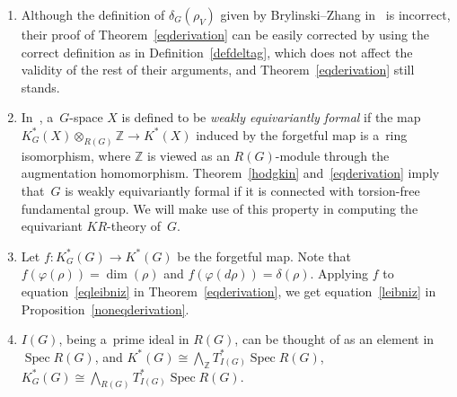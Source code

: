 \documentclass[pdftex]{sigma}
\numberwithin{equation}{section}
\DeclareMathOperator{\Spec}{Spec}
\begin{document}
\begin{Remark}\label{weakequivformality}\quad
\begin{enumerate}\itemsep=0pt
\item
Although the def\/inition of $\delta_G(\rho_V)$ given by Brylinski--Zhang in~\cite{BZ} is incorrect, their proof of
Theorem~\ref{eqderivation} can be easily corrected by using the correct def\/inition as in Def\/inition~\ref{defdeltag},
which does not af\/fect the validity of the rest of their arguments, and Theorem~\ref{eqderivation} still stands.
\item
In~\cite{HL}, a~$G$-space $X$ is def\/ined to be \emph{weakly equivariantly formal} if the map
$K^*_G(X)\otimes_{R(G)}\mathbb{Z}\to K^*(X)$ induced by the forgetful map is a~ring isomorphism, where $\mathbb{Z}$ is
viewed as an $R(G)$-module through the augmentation homomorphism.
Theorem~\ref{hodgkin} and~\ref{eqderivation} imply that~$G$ is weakly equivariantly formal if it is connected with
torsion-free fundamental group.
We will make use of this property in computing the equivariant $KR$-theory of~$G$.
\item
Let $f: K_G^*(G)\to K^*(G)$ be the forgetful map.
Note that $f(\varphi(\rho))=\dim(\rho)$ and $f(\varphi(d\rho))=\delta(\rho)$.
Applying $f$ to equation~\eqref{eqleibniz} in Theorem~\ref{eqderivation}, we get equation~\eqref{leibniz} in
Proposition~\ref{noneqderivation}.
\item
$I(G)$, being a~prime ideal in $R(G)$, can be thought of as an element in $\Spec R(G)$, and
$K^*(G)\cong\bigwedge_{\mathbb{Z}}T^*_{I(G)}\Spec R(G)$, $K_G^*(G)\cong\bigwedge_{R(G)}T^*_{I(G)}\Spec R(G)$.
\end{enumerate}
\end{Remark}
\end{document}
